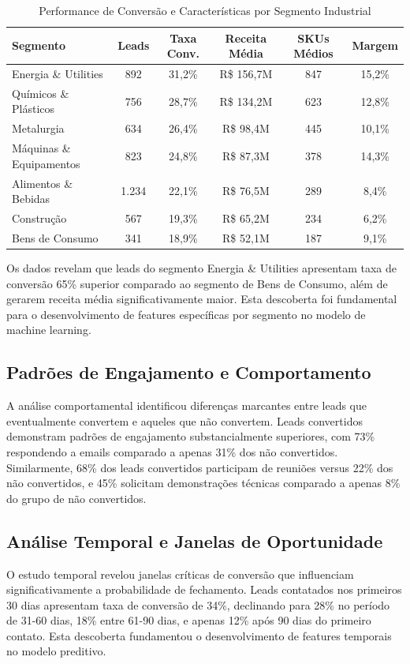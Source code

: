 \documentclass[portuguese,11pt]{article}
\begin{document}
\begin{table}[H]
\centering
\begin{tabular}{lccccc}
\toprule
\textbf{Segmento} & \textbf{Leads} & \textbf{Taxa Conv.} & \textbf{Receita Média} & \textbf{SKUs Médios} & \textbf{Margem} \\
\midrule
Energia \& Utilities & 892 & 31,2\% & R\$ 156,7M & 847 & 15,2\% \\
Químicos \& Plásticos & 756 & 28,7\% & R\$ 134,2M & 623 & 12,8\% \\
Metalurgia & 634 & 26,4\% & R\$ 98,4M & 445 & 10,1\% \\
Máquinas \& Equipamentos & 823 & 24,8\% & R\$ 87,3M & 378 & 14,3\% \\
Alimentos \& Bebidas & 1.234 & 22,1\% & R\$ 76,5M & 289 & 8,4\% \\
Construção & 567 & 19,3\% & R\$ 65,2M & 234 & 6,2\% \\
Bens de Consumo & 341 & 18,9\% & R\$ 52,1M & 187 & 9,1\% \\
\bottomrule
\end{tabular}
\caption{Performance de Conversão e Características por Segmento Industrial}
\end{table}

Os dados revelam que leads do segmento Energia \& Utilities apresentam taxa de conversão 65\% superior comparado ao segmento de Bens de Consumo, além de gerarem receita média significativamente maior. Esta descoberta foi fundamental para o desenvolvimento de features específicas por segmento no modelo de machine learning.

\subsection{Padrões de Engajamento e Comportamento}
A análise comportamental identificou diferenças marcantes entre leads que eventualmente convertem e aqueles que não convertem. Leads convertidos demonstram padrões de engajamento substancialmente superiores, com 73\% respondendo a emails comparado a apenas 31\% dos não convertidos. Similarmente, 68\% dos leads convertidos participam de reuniões versus 22\% dos não convertidos, e 45\% solicitam demonstrações técnicas comparado a apenas 8\% do grupo de não convertidos.

\subsection{Análise Temporal e Janelas de Oportunidade}
O estudo temporal revelou janelas críticas de conversão que influenciam significativamente a probabilidade de fechamento. Leads contatados nos primeiros 30 dias apresentam taxa de conversão de 34\%, declinando para 28\% no período de 31-60 dias, 18\% entre 61-90 dias, e apenas 12\% após 90 dias do primeiro contato. Esta descoberta fundamentou o desenvolvimento de features temporais no modelo preditivo.
\end{document}
